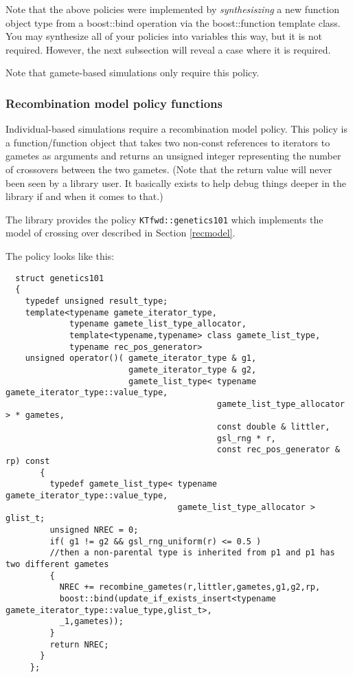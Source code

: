 \documentclass{article}
\begin{document}
Note that the above policies were implemented by \textit{synthesiszing} a new function object type from a boost::bind operation via the boost::function template class.  You may synthesize all of your policies into variables this way, but it is not required.  However, the next subsection will reveal a case where it is required.

Note that gamete-based simulations only require this policy.

\subsubsection{Recombination model policy functions}
Individual-based simulations require a recombination model policy.  This policy is a function/function object that takes two non-const references to iterators to gametes as arguments and returns an unsigned integer representing the number of crossovers between the two gametes.  (Note that the return value will never been seen by a library user.  It basically exists to help debug things deeper in the library if and when it comes to that.)  

The library provides the policy \texttt{KTfwd::genetics101} which implements the model of crossing over described in Section \ref{recmodel}.  

The policy looks like this:
\begin{lstlisting}
  struct genetics101
  {
    typedef unsigned result_type;
    template<typename gamete_iterator_type,
             typename gamete_list_type_allocator,
             template<typename,typename> class gamete_list_type,
             typename rec_pos_generator>
    unsigned operator()( gamete_iterator_type & g1,
                         gamete_iterator_type & g2,
                         gamete_list_type< typename gamete_iterator_type::value_type,
                                           gamete_list_type_allocator > * gametes,
                                           const double & littler,
                                           gsl_rng * r,
                                           const rec_pos_generator & rp) const
       {
         typedef gamete_list_type< typename gamete_iterator_type::value_type, 
                                   gamete_list_type_allocator > glist_t;
         unsigned NREC = 0;
         if( g1 != g2 && gsl_rng_uniform(r) <= 0.5 )
         //then a non-parental type is inherited from p1 and p1 has two different gametes                                    
         {
           NREC += recombine_gametes(r,littler,gametes,g1,g2,rp,
           boost::bind(update_if_exists_insert<typename gamete_iterator_type::value_type,glist_t>,
           _1,gametes));
         }
         return NREC;
       }
     };
\end{lstlisting}
\end{document}
